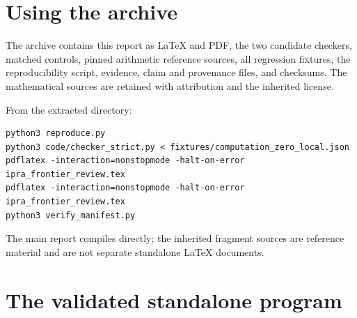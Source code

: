 \documentclass[11pt,letterpaper]{article}
\theoremstyle{definition}
\begin{document}
\appendix
\section{Using the archive}
The archive contains this report as LaTeX and PDF, the two candidate
checkers, matched controls, pinned arithmetic reference sources, all
regression fixtures, the reproducibility script, evidence, claim and
provenance files, and checksums. The mathematical sources are retained with
attribution and the inherited license.

From the extracted directory:
\begin{lstlisting}[language={}]
python3 reproduce.py
python3 code/checker_strict.py < fixtures/computation_zero_local.json
pdflatex -interaction=nonstopmode -halt-on-error ipra_frontier_review.tex
pdflatex -interaction=nonstopmode -halt-on-error ipra_frontier_review.tex
python3 verify_manifest.py
\end{lstlisting}
The main report compiles directly; the inherited fragment sources are
reference material and are not separate standalone LaTeX documents.

\clearpage
\section{The validated standalone program}

\end{document}
